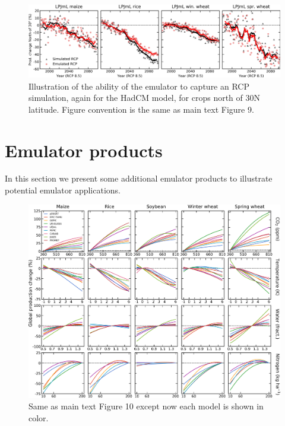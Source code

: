 \documentclass[12pt]{article}
\begin{document}
\begin{figure}[h!]
  \centering
  \includegraphics[width = 16.3cm]{LPJMLRCP85comp_30N.png}
  \caption{
  Illustration of the ability of the emulator to capture an RCP simulation, again for the HadCM model, for crops north of 30N latitude. Figure convention is the same as main text Figure 9.
  }
  \label{fig:lpjmlrcp}
\end{figure}

\clearpage
\section{Emulator products}
\begin{flushleft}
In this section we present some additional emulator products to illustrate potential emulator applications. 
\end{flushleft}

\begin{figure}[h!]
  \centering
  \includegraphics[width = 16.3cm]{em_CTWN_all_crops_color.png}
  \caption{
  Same as main text Figure 10 except now each model is shown in color.
  }
  \label{fig:all_dims}
\end{figure}
\end{document}
